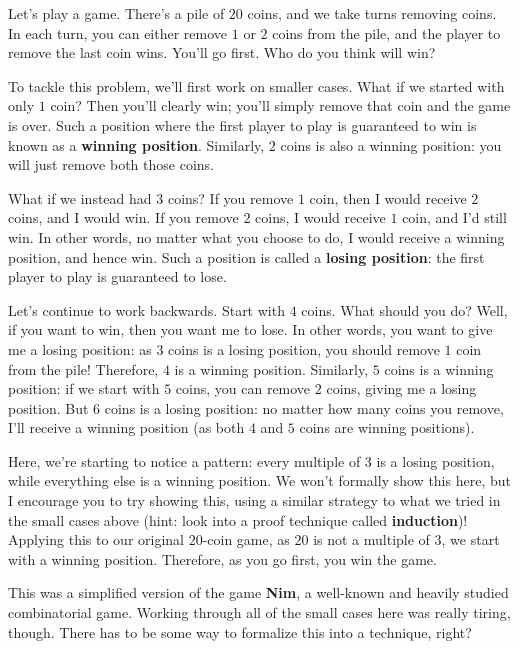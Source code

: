 \documentclass{article}
\begin{document}
\begin{multicols}{3}
Let's play a game. There's a pile of $20$ coins, and we take turns removing coins. In each turn, you can either remove $1$ or $2$ coins from the pile, and the player to remove the last coin wins. You'll go first. Who do you think will win?

To tackle this problem, we'll first work on smaller cases. What if we started with only $1$ coin? Then you'll clearly win; you'll simply remove that coin and the game is over. Such a position where the first player to play is guaranteed to win is known as a \textbf{winning position}. Similarly, $2$ coins is also a winning position: you will just remove both those coins.

What if we instead had $3$ coins? If you remove $1$ coin, then I would receive $2$ coins, and I would win. If you remove $2$ coins, I would receive $1$ coin, and I'd still win. In other words, no matter what you choose to do, I would receive a winning position, and hence win. Such a position is called a \textbf{losing position}: the first player to play is guaranteed to lose.

Let's continue to work backwards. Start with $4$ coins. What should you do? Well, if you want to win, then you want me to lose. In other words, you want to give me a losing position: as $3$ coins is a losing position, you should remove $1$ coin from the pile! Therefore, $4$ is a winning position. Similarly, $5$ coins is a winning position: if we start with $5$ coins, you can remove $2$ coins, giving me a losing position. But $6$ coins is a losing position: no matter how many coins you remove, I'll receive a winning position (as both $4$ and $5$ coins are winning positions).

Here, we're starting to notice a pattern: every multiple of $3$ is a losing position, while everything else is a winning position. We won't formally show this here, but I encourage you to try showing this, using a similar strategy to what we tried in the small cases above (hint: look into a proof technique called \textbf{induction})! Applying this to our original $20$-coin game, as $20$ is not a multiple of $3$, we start with a winning position. Therefore, as you go first, you win the game.

This was a simplified version of the game \textbf{Nim}, a well-known and heavily studied combinatorial game. Working through all of the small cases here was really tiring, though. There has to be some way to formalize this into a technique, right?


\end{multicols}
\end{document}
